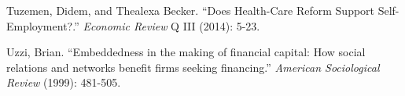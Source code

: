 \documentclass[12pt]{article}
\begin{document}
\begin{thebibliography}{99}
\begin{comment}

http://dish.andrewsullivan.com/2014/04/16/obamas-meep-meep-on-health-care


\bibitem{businessweek}
Symonds, William C. ``In Massachusetts, Health Care for All?'' Bloomberg Business Week. Bloomberg, 03 Apr. 2006. Web. 26 Jan. 2015.

\bibitem{wooldridgeBook}
Wooldridge, J. M.  2002.  Econometric Analysis of Cross Section and Panel Data.  Cambridge, MA: MIT Press.

\bibitem{census}
http://www.census.gov/prod/2008pubs/p60-235.pdf

Insured if covered by any kind of health insurance for all or part of the previous year

\bibitem{globe}
http://managinghealthcarecosts.blogspot.com/2011/06/romneycare-works.html
2008 drop in uninsured and spike in costs

\bibitem{chia}
Asks if they currently have health insurance. 2008, summer, other years spring


\bibitem{individual}
https://www.power2u.org/downloads/Mass-health-care-reform-2011.pdf
Individual plan enrollment grew between 2006 and 2008

\bibitem{summers}
Mandated Benefit Incidence (Summers, 1989)


\end{comment}

Tuzemen, Didem, and Thealexa Becker. ``Does Health-Care Reform Support Self-Employment?.'' \emph{Economic Review} Q III (2014): 5-23.

Uzzi, Brian. ``Embeddedness in the making of financial capital: How social relations and networks benefit firms seeking financing.'' \emph{American Sociological Review} (1999): 481-505.

\end{thebibliography}
\end{document}
